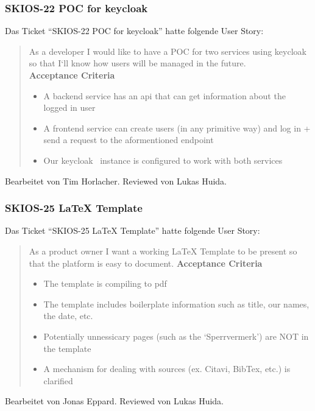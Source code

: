 \subsubsection{SKIOS-22 POC for keycloak}
Das Ticket \enquote{SKIOS-22 POC for keycloak} hatte folgende User Story:
\begin{quotation}
    As a developer I would like to have a POC for two services using keycloak~\parencite{web/Keycloak} so that I`ll know how users will be managed in the future. \\
    \textbf{Acceptance Criteria}
    \begin{itemize}
        \item A backend service has an api that can get information about the logged in user
        \item A frontend service can create users (in any primitive way) and log in + send a request to the aformentioned endpoint
        \item Our keycloak~\parencite{git/skiosa/orm} instance is configured to work with both services
    \end{itemize}
\end{quotation}
Bearbeitet von Tim Horlacher.
Reviewed von Lukas Huida.

\subsubsection{SKIOS-25 LaTeX Template}
Das Ticket \enquote{SKIOS-25 LaTeX Template} hatte folgende User Story:
\begin{quotation}
    As a product owner I want a working LaTeX Template to be present so that the platform is easy to document.
\textbf{Acceptance Criteria}
\begin{itemize}
    \item The template is compiling to pdf
    \item The template includes boilerplate information such as title, our names, the date, etc.
    \item Potentially unnessicary pages (such as the \enquote*{Sperrvermerk}) are NOT in the template
    \item A mechanism for dealing with sources (ex. Citavi, BibTex, etc.) is clarified
\end{itemize}
\end{quotation}
Bearbeitet von Jonas Eppard.
Reviewed von Lukas Huida.

